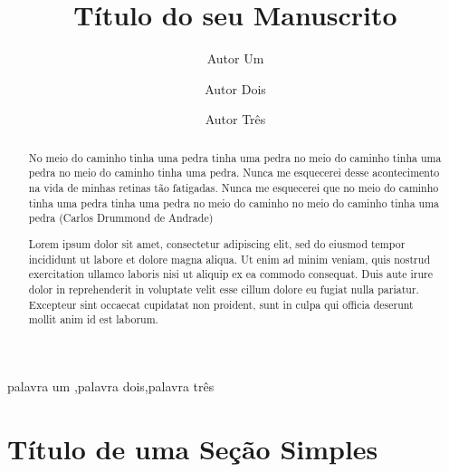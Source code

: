 \documentclass[12pt]{elsarticle}
\begin{document}
\begin{frontmatter}

\title{Título do seu Manuscrito}

\date{ }

\author[1,2,3]{Autor Um}
\author[2,*]{Autor Dois}
\author[1]{Autor Três}

\address[1]{Departamento de Computação, Grupo de Pesquisa, Rua do Saber, Cidade, Estado, Brasil}
\address[2]{Escola de Ciência, Universidade de Tecnologia, Rua do Conhecimento, 200, Cidade, Estado, Brasil}
\address[3]{Centro de Inteligência, Faculdade de Ciências, Rua do Jardim, s/n, Cidade, Estado, Brasil}

\address[*]{Autor para correspondência: email@myemail.com}


\begin{abstract}
\begin{resumop}
No meio do caminho tinha uma pedra tinha uma pedra no meio do caminho tinha uma pedra no meio do caminho tinha uma pedra. Nunca me esquecerei desse acontecimento na vida de minhas retinas tão fatigadas. Nunca me esquecerei que no meio do caminho tinha uma pedra tinha uma pedra no meio do caminho no meio do caminho tinha uma pedra (Carlos Drummond de Andrade)
\end{resumop}

\begin{resumoi}
Lorem ipsum dolor sit amet, consectetur adipiscing elit, sed do eiusmod tempor incididunt ut labore et dolore magna aliqua. Ut enim ad minim veniam, quis nostrud exercitation ullamco laboris nisi ut aliquip ex ea commodo consequat. Duis aute irure dolor in reprehenderit in voluptate velit esse cillum dolore eu fugiat nulla pariatur. Excepteur sint occaecat cupidatat non proident, sunt in culpa qui officia deserunt mollit anim id est laborum.
\end{resumoi}
\end{abstract}

\begin{keyword}
palavra um \sep palavra dois\sep palavra três
\end{keyword}

\end{frontmatter}

\section{Título de uma Seção Simples}
\label{sec:sample1}
\end{document}
